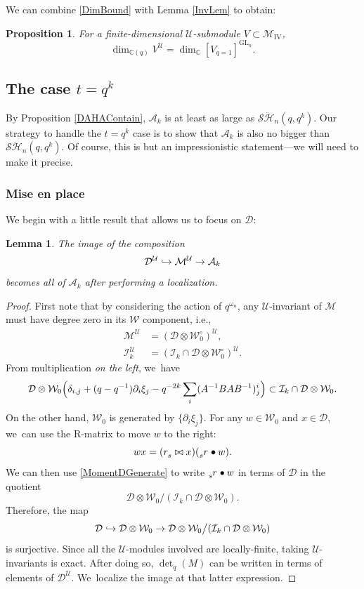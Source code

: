 \documentclass[11pt]{article}
\newcommand{\ie}{i.e.,\xspace}
\newcommand\hto{\mathrel{\lhook\joinrel\to}}
\newcommand{\GL}{\mathrm{GL}}
\newtheorem{prop}[thm]{Proposition}
\newtheorem{lem}[thm]{Lemma}
\theoremstyle{definition}
\newcommand{\CC}{\mathbb{C}}
\newcommand{\UU}{\mathcal{U}}
\newcommand{\DD}{\mathcal{D}}
\newcommand{\WW}{\mathcal{W}}
\newcommand{\AAA}{\mathcal{A}}
\newcommand{\MM}{\mathcal{M}}
\newcommand{\SHH}{\mathcal{S}\ddot{\mathcal{H}}}
\newcommand{\del}{\partial}
\begin{document}
We can combine \eqref{DimBound} with Lemma \ref{InvLem} to obtain:
\begin{prop}\label{DInvProp}
For a finite-dimensional $\UU$-submodule $V\subset\MM_{\mathrm{IV}}$,
\begin{equation}
\dim_{\CC(q)} V^\UU = \dim_\CC[ V_{q=1}]^{\GL_n}.
\label{InvBound}
\end{equation}
\end{prop}

\subsection{The case $t=q^k$}\label{qkCase}
By Proposition \ref{DAHAContain}, $\AAA_k$ is at least as large as $\SHH_n(q,q^k)$.
Our strategy to handle the $t=q^k$ case is to show that $\AAA_k$ is also no bigger than $\SHH_n(q,q^k)$.
Of course, this is but an impressionistic statement---we will need to make it precise.

\subsubsection{Mise en place}
We begin with a little result that allows us to focus on $\DD$:

\begin{lem}\label{DGenerate}
The image of the composition
\[
\DD^\UU\hto\MM^\UU\to\AAA_k
\]
becomes all of $\AAA_k$ after performing a localization.
\end{lem}

\begin{proof}
First note that by considering the action of $q^{\omega_n}$, any $\UU$-invariant of $\MM$ must have degree zero in its $\WW$ component, \ie
\begin{align*}
\MM^\UU&=\left(\DD\otimes\WW_0^\circ \right)^\UU,\\
\mathcal{I}_k^\UU&= \left(\mathcal{I}_k\cap\DD\otimes\WW_0^\circ \right)^\UU.
\end{align*}
From multiplication \textit{on the left}, we~have
\begin{equation}
\DD\otimes\WW_0\Bigl(\delta_{i,j}+(q-q^{-1})\del_i\xi_j -q^{-2k}\sum_i(A^{-1}BAB^{-1})_j^i\Bigr)\subset\mathcal{I}_k\cap\DD\otimes\WW_0.
\label{MomentDGenerate}
\end{equation}
On the other hand, $\WW_0$ is generated by $\{\del_i\xi_j\}$.
For any $w\in\WW_0$ and $x\in\DD$, we~can use the R-matrix to move $w$ to the right:
\[
wx=(\tensor[]{r}{_s}\bowtie x)(\tensor[_s]{r}{}\bullet w).
\]
We can then use \eqref{MomentDGenerate} to write $\tensor[_s]{r}{}\bullet w$ in terms of $\DD$ in the quotient
\[
\DD\otimes\WW_0\big/(\mathcal{I}_k\cap\DD\otimes\WW_0).
\]
Therefore, the map
\[
\DD\hto\DD\otimes\WW_0\to\DD\otimes\WW_0\big/(\mathcal{I}_k\cap\DD\otimes\WW_0)
\]
is surjective.
Since all the $\UU$-modules involved are locally-finite, taking $\UU$-invariants is exact.
After doing so, $\det_q(M)$ can be written in terms of elements of $\DD^\UU$. We~localize the image at that latter expression.
\end{proof}
\end{document}
